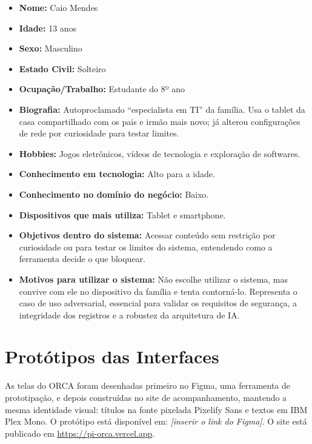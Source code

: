 \documentclass[
    12pt,           %
    oneside,        %
    a4paper,        %
    chapter=TITLE,  %
    english,        %
    brazil          %
]{abntex2}
\begin{document}
\begin{itemize}
    \item \textbf{Nome:} Caio Mendes
    \item \textbf{Idade:} 13 anos
    \item \textbf{Sexo:} Masculino
    \item \textbf{Estado Civil:} Solteiro
    \item \textbf{Ocupação/Trabalho:} Estudante do 8º ano
    \item \textbf{Biografia:} Autoproclamado ``especialista em TI'' da família. Usa o tablet da casa compartilhado com os pais e irmão mais novo; já alterou configurações de rede por curiosidade para testar limites.
    \item \textbf{Hobbies:} Jogos eletrônicos, vídeos de tecnologia e exploração de softwares.
    \item \textbf{Conhecimento em tecnologia:} Alto para a idade.
    \item \textbf{Conhecimento no domínio do negócio:} Baixo.
    \item \textbf{Dispositivos que mais utiliza:} Tablet e smartphone.
    \item \textbf{Objetivos dentro do sistema:} Acessar conteúdo sem restrição por curiosidade ou para testar os limites do sistema, entendendo como a ferramenta decide o que bloquear.
    \item \textbf{Motivos para utilizar o sistema:} Não escolhe utilizar o sistema, mas convive com ele no dispositivo da família e tenta contorná-lo. Representa o caso de uso adversarial, essencial para validar os requisitos de segurança, a integridade dos registros e a robustez da arquitetura de IA.
\end{itemize}


\chapter{Protótipos das Interfaces}

As telas do ORCA foram desenhadas primeiro no Figma, uma ferramenta de
prototipação, e depois construídas no site de acompanhamento, mantendo a mesma
identidade visual: títulos na fonte pixelada Pixelify Sans e textos em IBM
Plex Mono. O protótipo está disponível em: \textit{[inserir o link do
Figma]}. O site está publicado em \url{https://pi-orca.vercel.app}.
\end{document}
